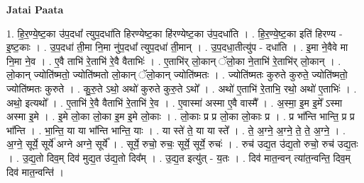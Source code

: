 \documentclass[17pt]{extarticle}
\begin{document}
\textbf{Jatai Paata} \newline

1. हि॒र॒ण्ये॒ष्ट॒का उ॑प॒दधा᳚ त्युप॒दधा॑ति हिरण्येष्ट॒का हि॑रण्येष्ट॒का उ॑प॒दधा॑ति । . हि॒र॒ण्ये॒ष्ट॒का इति॑ हिरण्य - इ॒ष्ट॒काः । . उ॒प॒दधा॑ ती॒मा नि॒मा नु॑प॒दधा᳚ त्युप॒दधा॑ ती॒मान् । . उ॒प॒दधा॒तीत्यु॑प - दधा॑ति । . इ॒मा ने॒वैवे मा नि॒मा ने॒व । . ए॒वै ताभि॑ रे॒ताभि॑ रे॒वै वैताभिः॑ । . ए॒ताभि॑र् लो॒कान् ॅलो॒का ने॒ताभि॑ रे॒ताभि॑र् लो॒कान् । . लो॒कान् ज्योति॑ष्मतो॒ ज्योति॑ष्मतो लो॒कान् ॅलो॒कान् ज्योति॑ष्मतः । . ज्योति॑ष्मतः कुरुते कुरुते॒ ज्योति॑ष्मतो॒ ज्योति॑ष्मतः कुरुते । . कु॒रु॒ते ऽथो॒ अथो॑ कुरुते कुरु॒ते ऽथो᳚ । . अथो॑ ए॒ताभि॑ रे॒ताभि॒ रथो॒ अथो॑ ए॒ताभिः॑ । . अथो॒ इत्यथो᳚ । . ए॒ताभि॑ रे॒वै वैताभि॑ रे॒ताभि॑ रे॒व । . ए॒वास्मा॑ अस्मा ए॒वै वास्मै᳚ । . अ॒स्मा॒ इ॒म इ॒मे᳚ ऽस्मा अस्मा इ॒मे । . इ॒मे लो॒का लो॒का इ॒म इ॒मे लो॒काः । . लो॒काः प्र प्र लो॒का लो॒काः प्र । . प्र भा᳚न्ति भान्ति॒ प्र प्र भा᳚न्ति । . भा॒न्ति॒ या या भा᳚न्ति भान्ति॒ याः । . या स्ते॑ ते॒ या या स्ते᳚ । . ते॒ अ॒ग्ने॒ अ॒ग्ने॒ ते॒ ते॒ अ॒ग्ने॒ । . अ॒ग्ने॒ सूर्ये॒ सूर्ये॑ अग्ने अग्ने॒ सूर्ये᳚ । . सूर्ये॒ रुचो॒ रुचः॒ सूर्ये॒ सूर्ये॒ रुचः॑ । . रुच॑ उद्य॒त उ॑द्य॒तो रुचो॒ रुच॑ उद्य॒तः । . उ॒द्य॒तो दिव॒म् दिव॑ मुद्य॒त उ॑द्य॒तो दिव᳚म् । . उ॒द्य॒त इत्यु॑त् - य॒तः । . दिव॑ मात॒न्वन् त्या॑त॒न्वन्ति॒ दिव॒म् दिव॑ मात॒न्वन्ति॑ । \newline
\end{document}
